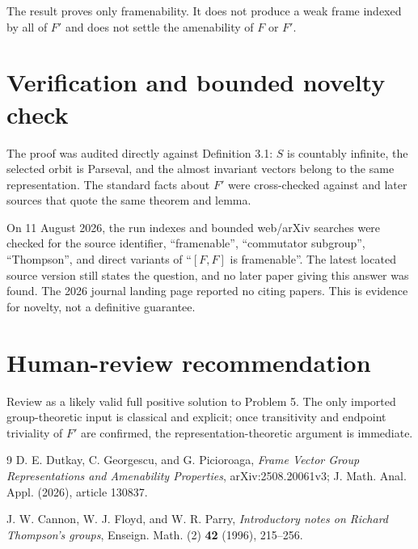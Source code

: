 \documentclass[11pt]{article}
\begin{document}
The result proves only framenability.  It does not produce a weak frame indexed by all of $F'$ and does not settle the amenability of $F$ or $F'$.

\section*{Verification and bounded novelty check}
The proof was audited directly against Definition 3.1: $S$ is countably infinite, the selected orbit is Parseval, and the almost invariant vectors belong to the same representation.  The standard facts about $F'$ were cross-checked against \cite{CFP} and later sources that quote the same theorem and lemma.

On 11 August 2026, the run indexes and bounded web/arXiv searches were checked for the source identifier, ``framenable'', ``commutator subgroup'', ``Thompson'', and direct variants of ``$[F,F]$ is framenable''.  The latest located source version still states the question, and no later paper giving this answer was found.  The 2026 journal landing page reported no citing papers.  This is evidence for novelty, not a definitive guarantee.

\section*{Human-review recommendation}
Review as a likely valid full positive solution to Problem 5.  The only imported group-theoretic input is classical and explicit; once transitivity and endpoint triviality of $F'$ are confirmed, the representation-theoretic argument is immediate.

\begin{thebibliography}{9}
D. E. Dutkay, C. Georgescu, and G. Picioroaga,
\emph{Frame Vector Group Representations and Amenability Properties},
arXiv:2508.20061v3; J. Math. Anal. Appl. (2026), article 130837.

J. W. Cannon, W. J. Floyd, and W. R. Parry,
\emph{Introductory notes on Richard Thompson's groups},
Enseign. Math. (2) \textbf{42} (1996), 215--256.
\end{thebibliography}
\end{document}
